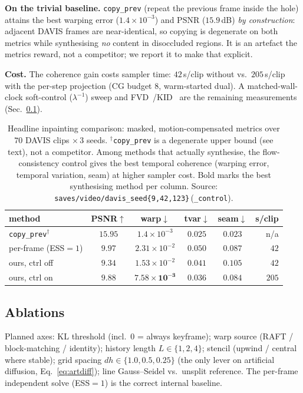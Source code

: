 \medskip\noindent\textbf{On the trivial baseline.} \texttt{copy\_prev} (repeat
the previous frame inside the hole) attains the best warping error
($1.4\times10^{-3}$) and PSNR ($15.9$\,dB) \emph{by construction}: adjacent DAVIS
frames are near-identical, so copying is degenerate on both metrics while
synthesising \emph{no} content in disoccluded regions. It is an artefact the
metrics reward, not a competitor; we report it to make that explicit.

\medskip\noindent\textbf{Cost.} The coherence gain costs sampler time: $42$\,s/clip
without vs.\ $205$\,s/clip with the per-step projection (CG budget $8$,
warm-started dual). A matched-wall-clock soft-control ($\lambda^{-1}$) sweep and
FVD~\cite{unterthiner-2018-fvd}/KID~\cite{binkowski-2018-kid} are the remaining
measurements (Sec.~\ref{sec:ablations}).

\begin{table}[t]
  \centering
  \footnotesize
  \setlength{\tabcolsep}{3.5pt}
  \begin{tabular}{lccccr}
    \toprule
    method & PSNR$\uparrow$ & warp$\downarrow$ & tvar$\downarrow$ & seam$\downarrow$ & s/clip\\
    \midrule
    \texttt{copy\_prev}$^\dagger$ & $15.95$ & $1.4\!\times\!10^{-3}$ & $0.025$ & $0.023$ & n/a\\
    per-frame (ESS$=1$)   & $\mathbf{9.97}$ & $2.31\!\times\!10^{-2}$ & $0.050$ & $0.087$ & $42$\\
    ours, ctrl off        & $9.34$ & $1.53\!\times\!10^{-2}$ & $0.041$ & $0.105$ & $42$\\
    ours, ctrl on         & $9.88$ & $\mathbf{7.58\!\times\!10^{-3}}$ & $\mathbf{0.036}$ & $\mathbf{0.084}$ & $205$\\
    \bottomrule
  \end{tabular}
  \caption{Headline inpainting comparison: masked, motion-compensated metrics
  over $70$ DAVIS clips $\times\,3$ seeds. $^\dagger$\texttt{copy\_prev} is a
  degenerate upper bound (see text), not a competitor. Among methods that actually
  synthesise, the flow-consistency control gives the best temporal coherence
  (warping error, temporal variation, seam) at higher sampler cost. Bold marks
  the best synthesising method per column. Source:
  \texttt{saves/video/davis\_seed\{9,42,123\}}\,(\texttt{\_control}).}
  \label{tab:inpaint}
\end{table}

\subsection{Ablations}
\label{sec:ablations}
Planned axes: KL threshold (incl.\ $0$ = always keyframe); warp source
(RAFT / block-matching / identity); history length $L\in\{1,2,4\}$; stencil
(upwind / central where stable); grid spacing $dh\in\{1.0,0.5,0.25\}$ (the only
lever on artificial diffusion, Eq.~\ref{eq:artdiff}); line Gauss--Seidel vs.\
unsplit reference. The per-frame independent solve (ESS$=1$) is the correct
internal baseline.

